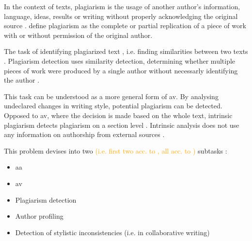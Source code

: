 \begin{definition}
    [Plagiarism]
    In the context of texts, plagiarism is the usage of another author's information, language, ideas, results
    or writing without properly acknowledging the original source \cite{stein_intrinsic_2011,gohsen_task_oriented_2024}.
    \citet{elmanarelbouanani_authorship_2014} define plagiarism as the complete or partial replication 
    of a piece of work with or without permission of the original author.
\end{definition}

\begin{definition}
    The task of identifying plagiarized text \cite{stein_intrinsic_2011}, i.e. finding similarities between two texts \cite{stamatatos_survey_2009}.
    Plagiarism detection uses similarity detection, determining whether multiple pieces of work were produced by a single author 
    without necessarly identifying the author \cite{elmanarelbouanani_authorship_2014}.
\end{definition}

\begin{definition}
    This task can be understood as a more general form of \ac{av}.
    By analysing undeclared changes in writing style, potential plagiarism can be detected.
    Opposed to \ac{av}, where the decision is made based on the whole text, 
    intrinsic plagiarism detects plagiarism on a section level \cite{stein_intrinsic_2011}.
    Intrinsic analysis does not use any information on authorship from external sources \cite{zangerle_overview_2024}.
\end{definition}

\begin{definition}
    This problem devises into two \textcolor{orange}{(i.e. first two acc. to \cite{stein_intrinsic_2011}, all acc. to \cite{stamatatos_survey_2009})} subtasks \cite{stein_intrinsic_2011}:
    \begin{itemize}
        \item \ac{aa} \cite{stein_intrinsic_2011}
        \item \ac{av} \cite{stein_intrinsic_2011,stamatatos_survey_2009}
        \item Plagiarism detection \cite{stamatatos_survey_2009}
        \item Author profiling \cite{stamatatos_survey_2009}
        \item Detection of stylistic inconsistencies (i.e. in collaborative writing) \cite{stamatatos_survey_2009}
    \end{itemize}
\end{definition}

